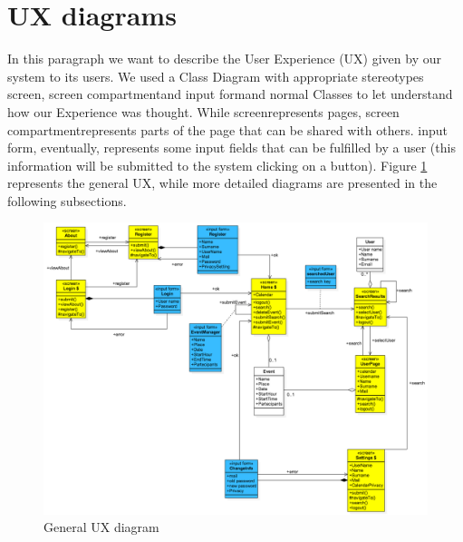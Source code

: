 \documentclass[10pt,a4paper,titlepage]{article}
\begin{document}
\section{UX diagrams}
\label{sec:UXdiagrams}
In this paragraph we want to describe the User Experience (UX) given by our system to its users. We used a Class Diagram with appropriate stereotypes \ll screen\gg, \ll screen compartment\gg and \ll input form\ggs and normal Classes to let understand how our Experience was thought. While \ll screen\gg represents pages, \ll screen compartment\gg represents parts of the page that can be shared with others. \ll input form\gg, eventually, represents some input fields that can be fulfilled by a user (this information will be submitted to the system clicking on a button).
Figure \ref{fig:ux} represents the general UX, while more detailed diagrams are presented in the following subsections.
\begin{figure}[h]
\centering
\includegraphics[width=\linewidth]{./images/ux}
\caption[Ux]{General UX diagram}
\label{fig:ux}
\end{figure}
\end{document}
